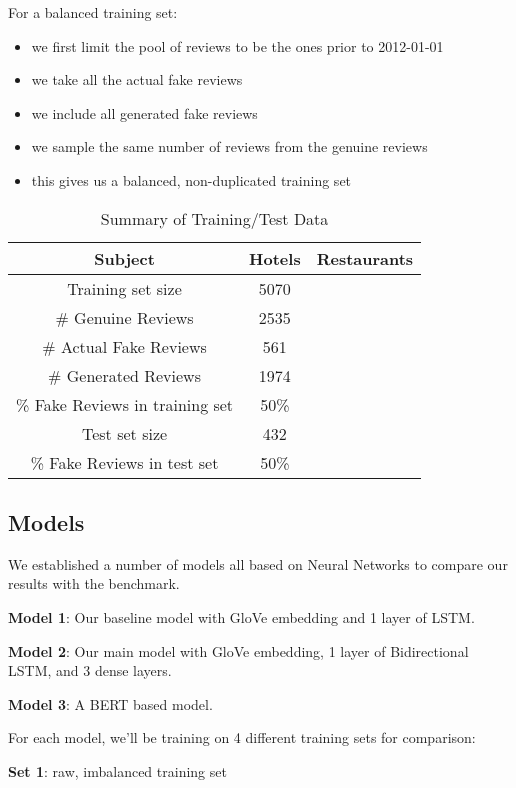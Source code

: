 \documentclass[conference, 11pt]{IEEEtran} %
\theoremstyle{plain}
\theoremstyle{definition}
\begin{document}
For a balanced training set:
\begin{itemize}
\setlength\itemsep{0em}
\item we first limit the pool of reviews to be the ones prior to 2012-01-01
\item we take all the actual fake reviews
\item we include all generated fake reviews
\item we sample the same number of reviews from the genuine reviews
\item this gives us a balanced, non-duplicated training set
\end{itemize}


\begin{table}[h!]
\small
\caption{Summary of Training/Test Data}
\centering
\begin{tabular}{|c|c|c|}
\hline
Subject & Hotels & Restaurants \\ \hline
Training set size & 5070 &  \\ \hline
\# Genuine Reviews & 2535  &  \\ \hline
\# Actual Fake Reviews & 561  &  \\ \hline
\# Generated Reviews & 1974 &  \\ \hline
\% Fake Reviews in training set & 50\% &  \\ \hline
Test set size & 432 &  \\ \hline
\% Fake Reviews in test set & 50\% &  \\ 
\hline
\end{tabular}
\label{trainining-data}

\end{table}

\subsection{Models}
We established a number of models all based on Neural Networks to compare our results with the benchmark.

\textbf{Model 1}: Our baseline model with GloVe embedding and 1 layer of LSTM.

\textbf{Model 2}: Our main model with GloVe embedding, 1 layer of Bidirectional LSTM, and 3 dense layers.

\textbf{Model 3}: A BERT based model.

For each model, we'll be training on 4 different training sets for comparison:

 \textbf{Set 1}: raw, imbalanced training set
 
\end{document}
